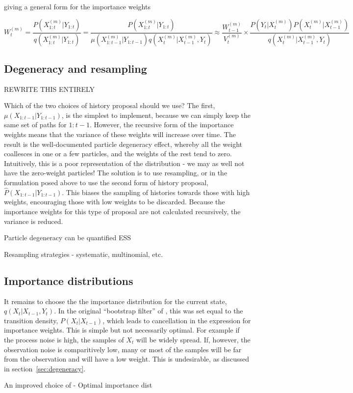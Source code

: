 giving a general form for the importance weights

\begin{equation}
W_t^{(m)} = \frac{P(X_{1:t}^{(m)}|Y_{1:t})}{q(X_{1:t}^{(m)}|Y_{1:t})} = \frac{P(X_{1:t}^{(m)}|Y_{1:t})}{\mu(X_{1:t-1}^{(m)}|Y_{1:t-1}) q(X_{t}^{(m)}|X_{t-1}^{(m)}, Y_{t})} \approx \frac{W_{t-1}^{(m)}}{V_{t}^{(m)}} \times \frac{ P(Y_t|X_t^{(m)})P(X_t^{(m)}|X_{t-1}^{(m)})}{q(X_t^{(m)}|X_{t-1}^{(m)}, Y_t)}
\label{eq:NoResampIW}
\end{equation}


\subsection{Degeneracy and resampling}

REWRITE THIS ENTIRELY

Which of the two choices of history proposal should we use? The first, $\mu(X_{1:t-1}|Y_{1:t-1})$, is the simplest to implement, because we can simply keep the same set of paths for $1:t-1$. However, the recursive form of the importance weights means that the variance of these weights will increase over time. The result is the well-documented particle degeneracy effect, whereby all the weight coallesces in one or a few particles, and the weights of the rest tend to zero. Intuitively, this is a poor representation of the distribution - we may as well not have the zero-weight particles! The solution is to use resampling, or in the formulation posed above to use the second form of history proposal, $\hat{P}(X_{1:t-1}|Y_{1:t-1})$. This biases the sampling of histories towards those with high weights, encouraging those with low weights to be discarded. Because the importance weights for this type of proposal are not calculated recursively, the variance is reduced.

Particle degeneracy can be quantified     ESS

Resampling strategies - systematic, multinomial, etc.



\subsection{Importance distributions}

It remains to choose the the importance distribution for the current state, $q(X_{t}|X_{t-1}, Y_{t})$. In the original ``bootstrap filter'' of \cite{Gordon1993}, this was set equal to the transition density, $P(X_t|X_{t-1})$, which leads to cancellation in the expression for importance weights. This is simple but not necessarily optimal. For example if the process noise is high, the samples of $X_t$ will be widely spread. If, however, the observation noise is comparitively low, many or most of the samples will be far from the observation and will have a low weight. This is undesirable, as discussed in section~\ref{sec:degeneracy}.

An improved choice of  - Optimal importance dist